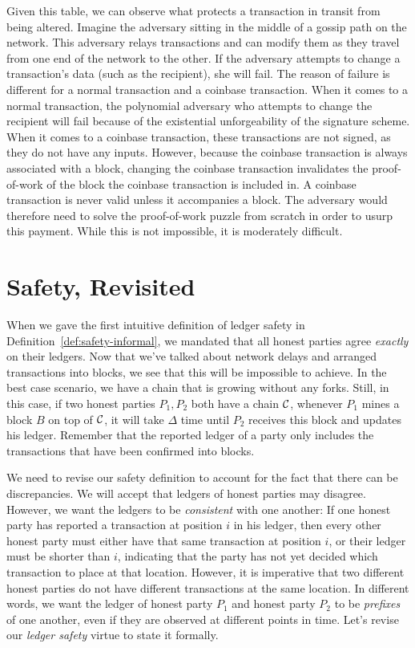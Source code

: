 Given this table, we can observe what protects a transaction in transit from being
altered. Imagine the adversary sitting in the middle of a gossip path on the network.
This adversary relays transactions and can modify them as they travel from one
end of the network to the other. If the adversary attempts to change a transaction's
data (such as the recipient), she will fail. The reason of failure is different for a
normal transaction and a coinbase transaction. When it comes to a normal transaction,
the polynomial adversary who attempts to change the recipient will fail because of the existential
unforgeability of the signature scheme. When it comes to a coinbase transaction,
these transactions are not signed, as they do not have any inputs. However, because
the coinbase transaction is always associated with a block, changing the coinbase
transaction invalidates the proof-of-work of the block the coinbase transaction is
included in. A coinbase transaction is never valid unless it accompanies a block.
The adversary would therefore need to solve the proof-of-work puzzle from scratch
in order to usurp this payment. While this is not impossible, it is moderately
difficult.

\section{Safety, Revisited}

When we gave the first intuitive definition of ledger safety in Definition~\ref{def:safety-informal}, we mandated that all honest parties
agree \emph{exactly} on their ledgers. Now that we've talked about network delays and arranged transactions into blocks, we see
that this will be impossible to achieve. In the best case scenario, we have a chain that is growing without any forks. Still, in this
case, if two honest parties $P_1, P_2$ both have a chain $\mathcal{C}$, whenever $P_1$ mines a block $B$ on top of $\mathcal{C}$, it will take
$\Delta$ time until $P_2$ receives this block and updates his ledger. Remember that the reported ledger of a party only includes the
transactions that have been confirmed into blocks.

We need to revise our safety definition to account for the fact that there can be discrepancies. We will accept that ledgers of honest
parties may disagree. However, we want the ledgers to be \emph{consistent} with one another: If one honest party has reported a transaction
at position $i$ in his ledger, then every other honest party must either have that same transaction at position $i$, or their ledger
must be shorter than $i$, indicating that the party has not yet decided which transaction to place at that location. However, it is imperative
that two different honest parties do not have different transactions at the same location. In different words, we want the ledger of
honest party $P_1$ and honest party $P_2$ to be \emph{prefixes} of one another, even if they are observed at different points in time.
Let's revise our \emph{ledger safety} virtue to state it formally.

